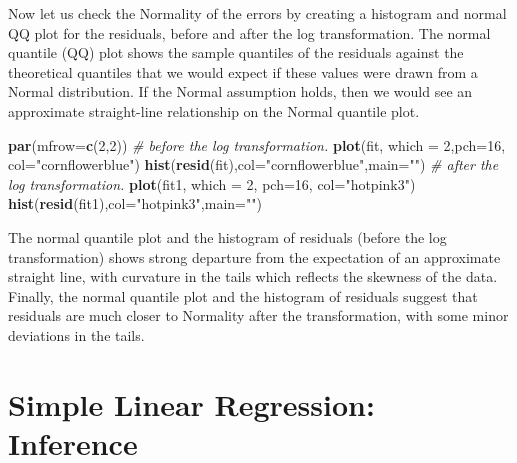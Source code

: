 \documentclass[
]{article}
\newenvironment{Shaded}{\begin{snugshade}}{\end{snugshade}}
\newcommand{\AttributeTok}[1]{\textcolor[rgb]{0.13,0.29,0.53}{#1}}
\newcommand{\CommentTok}[1]{\textcolor[rgb]{0.56,0.35,0.01}{\textit{#1}}}
\newcommand{\DecValTok}[1]{\textcolor[rgb]{0.00,0.00,0.81}{#1}}
\newcommand{\FunctionTok}[1]{\textcolor[rgb]{0.13,0.29,0.53}{\textbf{#1}}}
\newcommand{\NormalTok}[1]{#1}
\newcommand{\StringTok}[1]{\textcolor[rgb]{0.31,0.60,0.02}{#1}}
\begin{document}
Now let us check the Normality of the errors by creating a histogram and
normal QQ plot for the residuals, before and after the log
transformation. The normal quantile (QQ) plot shows the sample quantiles
of the residuals against the theoretical quantiles that we would expect
if these values were drawn from a Normal distribution. If the Normal
assumption holds, then we would see an approximate straight-line
relationship on the Normal quantile plot.

\begin{Shaded}
\begin{Highlighting}[]
\FunctionTok{par}\NormalTok{(}\AttributeTok{mfrow=}\FunctionTok{c}\NormalTok{(}\DecValTok{2}\NormalTok{,}\DecValTok{2}\NormalTok{))}
\CommentTok{\# before the log  transformation.}
\FunctionTok{plot}\NormalTok{(fit, }\AttributeTok{which =} \DecValTok{2}\NormalTok{,}\AttributeTok{pch=}\DecValTok{16}\NormalTok{, }\AttributeTok{col=}\StringTok{"cornflowerblue"}\NormalTok{)}
\FunctionTok{hist}\NormalTok{(}\FunctionTok{resid}\NormalTok{(fit),}\AttributeTok{col=}\StringTok{"cornflowerblue"}\NormalTok{,}\AttributeTok{main=}\StringTok{""}\NormalTok{)}
\CommentTok{\# after the log  transformation.}
\FunctionTok{plot}\NormalTok{(fit1, }\AttributeTok{which =} \DecValTok{2}\NormalTok{, }\AttributeTok{pch=}\DecValTok{16}\NormalTok{, }\AttributeTok{col=}\StringTok{"hotpink3"}\NormalTok{)  }
\FunctionTok{hist}\NormalTok{(}\FunctionTok{resid}\NormalTok{(fit1),}\AttributeTok{col=}\StringTok{"hotpink3"}\NormalTok{,}\AttributeTok{main=}\StringTok{""}\NormalTok{)}
\end{Highlighting}
\end{Shaded}


The normal quantile plot and the histogram of residuals (before the log
transformation) shows strong departure from the expectation of an
approximate straight line, with curvature in the tails which reflects
the skewness of the data. Finally, the normal quantile plot and the
histogram of residuals suggest that residuals are much closer to
Normality after the transformation, with some minor deviations in the
tails.

\hypertarget{simple-linear-regression-inference}{%
\section{Simple Linear Regression:
Inference}\label{simple-linear-regression-inference}}
\end{document}
